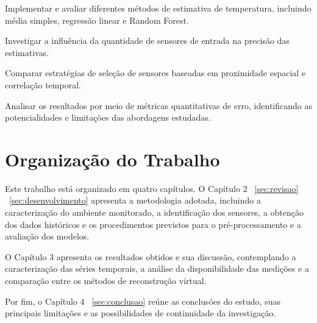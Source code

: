 Implementar e avaliar diferentes métodos de estimativa de temperatura, incluindo média simples, regressão linear e Random Forest.

Investigar a influência da quantidade de sensores de entrada na precisão das estimativas.

Comparar estratégias de seleção de sensores baseadas em proximidade espacial e correlação temporal.

Analisar os resultados por meio de métricas quantitativas de erro, identificando as potencialidades e limitações das abordagens estudadas.

\section{Organização do Trabalho}
Este trabalho está organizado em quatro capítulos. O Capítulo 2 ~\ref{sec:revisao} ~\ref{sec:desenvolvimento} apresenta a metodologia adotada, incluindo a caracterização do ambiente monitorado, a identificação dos sensores, a obtenção dos dados históricos e os procedimentos previstos para o pré-processamento e a avaliação dos modelos.

O Capítulo 3 apresenta os resultados obtidos e sua discussão, contemplando a caracterização das séries temporais, a análise da disponibilidade das medições e a comparação entre os métodos de reconstrução virtual.

Por fim, o Capítulo 4 ~\ref{sec:conclusao} reúne as conclusões do estudo, suas principais limitações e as possibilidades de continuidade da investigação.